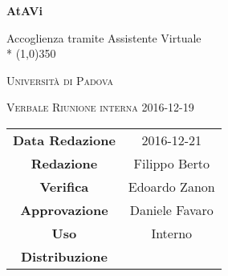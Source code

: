 \documentclass[a4paper,12pt]{article}
\author{Nome Autore}
\date{05/01/2016}
\begin{document}
\begin{titlepage}
	\centering
	{\huge\bfseries AtAVi\par}
	Accoglienza tramite Assistente Virtuale \\*
	\line(1,0){350} \\
	{\scshape\LARGE Università di Padova \par}
	\vspace{1cm}
	{\scshape\Large Verbale Riunione interna 2016-12-19\par}
	\vspace{1.5cm}
	\logo
	\vspace{2cm}	
	\vfill \vfill
	\begin{tabular}{c|c}
		{\hfill\textbf{Data Redazione}} 		& 2016-12-21 	\\
		{\hfill\textbf{Redazione}} 			& Filippo Berto		\\
		{\hfill\textbf{Verifica}} 				&  Edoardo Zanon\\
		{\hfill\textbf{Approvazione}} 				& Daniele Favaro 	\\
		{\hfill\textbf{Uso}} 				& Interno		\\
		{\hfill\textbf{Distribuzione}} 			& \kpanic\		\\
	\end{tabular}
\end{titlepage}

	\newpage
	\pagestyle{myfront}	
	\tableofcontents
	
	\label{LastFrontPage}
	\newpage
	\pagestyle{mymain}	
		
		
		
		
		
		
		
	
	\label{LastPage}
\end{document}
